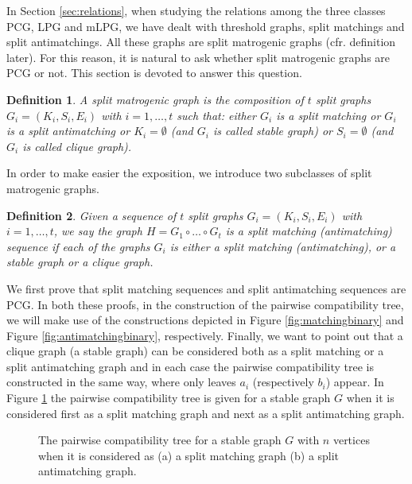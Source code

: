 \documentclass[dvipdfm]{llncs}
\newtheorem{Definition}{Definition}
\begin{document}
In Section \ref{sec:relations}, when studying the relations among the three classes PCG, LPG and mLPG, we have dealt with threshold graphs, split matchings and split antimatchings. All these graphs are split matrogenic graphs (cfr. definition later). For this reason, it is natural to ask whether split matrogenic graphs are PCG or not. This section is devoted to answer this question.


\begin{Definition}
A {\em split matrogenic} graph is the composition of $t$ split graphs $G_i=(K_i,S_i,E_i)$ with $i=1, \ldots, t$ such that: either $G_i$ is a split matching or $G_i$ is a split antimatching or $K_i=\emptyset$ (and $G_i$ is called {\em stable graph}) or $S_i=\emptyset$ (and $G_i$ is called {\em clique graph}).
\end{Definition}

In order to make easier the exposition, we introduce two subclasses of split matrogenic graphs.

\begin{Definition}
Given a sequence of $t$ split graphs $G_i=(K_i,S_i,E_i)$ with $i=1, \ldots, t$, we say the graph $H= G_1 \circ \ldots \circ G_t$ is a {\em split matching (antimatching) sequence} if each of the graphs $G_i$ is either a split matching (antimatching), or a  stable graph or a clique graph. 
\end{Definition}


We first prove that split matching sequences and split antimatching sequences are PCG. In both these proofs, in the construction of the pairwise compatibility tree, we will make use of the constructions depicted in Figure \ref{fig:matchingbinary} and Figure  \ref{fig:antimatchingbinary}, respectively. Finally, we want to point out that a clique graph (a stable graph) can be considered both as a split matching or a split antimatching graph and in each case the pairwise compatibility tree is constructed in the same way, where only leaves $a_i$ (respectively $b_i$) appear. In Figure \ref{fig:matchingAntimatchingEmpty} the pairwise compatibility tree is given for a stable graph $G$ when it is considered first as a split matching graph and next as a split antimatching graph.


\begin{figure}[!ht]
  \begin{center}
  \end{center}
\caption{\footnotesize{ The pairwise compatibility tree for a stable graph $G$ with $n$ vertices when it is considered as (a) a split matching graph  (b) a split antimatching graph. }}
\label{fig:matchingAntimatchingEmpty}
\end{figure}
\end{document}
